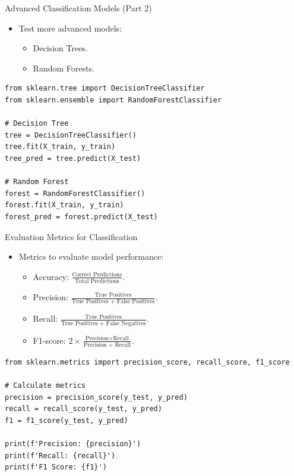 \documentclass{beamer}
\begin{document}
\begin{frame}[fragile]{Advanced Classification Models (Part 2)}
\begin{itemize}
    \item Test more advanced models:
    \begin{itemize}
        \item Decision Trees.
        \item Random Forests.
    \end{itemize}
\end{itemize}
\begin{lstlisting}
from sklearn.tree import DecisionTreeClassifier
from sklearn.ensemble import RandomForestClassifier

# Decision Tree
tree = DecisionTreeClassifier()
tree.fit(X_train, y_train)
tree_pred = tree.predict(X_test)

# Random Forest
forest = RandomForestClassifier()
forest.fit(X_train, y_train)
forest_pred = forest.predict(X_test)
\end{lstlisting}
\end{frame}

\begin{frame}[fragile]{Evaluation Metrics for Classification}
\begin{itemize}
    \item Metrics to evaluate model performance:
    \begin{itemize}
        \item Accuracy: $\frac{\text{Correct Predictions}}{\text{Total Predictions}}$.
        \item Precision: $\frac{\text{True Positives}}{\text{True Positives + False Positives}}$.
        \item Recall: $\frac{\text{True Positives}}{\text{True Positives + False Negatives}}$.
        \item F1-score: $2 \times \frac{\text{Precision} \times \text{Recall}}{\text{Precision + Recall}}$.
    \end{itemize}
\end{itemize}
\begin{lstlisting}
from sklearn.metrics import precision_score, recall_score, f1_score

# Calculate metrics
precision = precision_score(y_test, y_pred)
recall = recall_score(y_test, y_pred)
f1 = f1_score(y_test, y_pred)

print(f'Precision: {precision}')
print(f'Recall: {recall}')
print(f'F1 Score: {f1}')
\end{lstlisting}
\end{frame}
\end{document}
